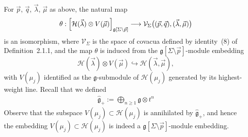 \documentclass[12pt]{article}
\begin{document}
\begin{theorem}[Theorem~2.2.2]
    For $\vec p$, $\vec q$, $\vec\lambda$, $\vec\mu$ as above, the natural map
    \[
        \theta:
        \Bigl[\mathcal H(\vec\lambda)\otimes V(\vec\mu)\Bigr]_{\mathfrak g[\Sigma\setminus\vec p]}
        \longrightarrow
        \mathcal V_{\Sigma}\bigl((\vec p,\vec q),(\vec\lambda,\vec\mu)\bigr)
    \]
    is an isomorphism, where $\mathcal V_{\Sigma}$ is the space of covacua defined by
    identity~(8) of Definition~2.1.1, and the map $\theta$ is induced from the
    $\mathfrak g[\Sigma\setminus\vec p]$-module embedding
    \[
        \mathcal H(\vec\lambda)\otimes V(\vec\mu)
        \hookrightarrow
        \mathcal H(\vec\lambda,\vec\mu),
    \]
    with $V(\mu_j)$ identified as the $\mathfrak g$-submodule of
    $\mathcal H(\mu_j)$ generated by its highest-weight line. Recall that we defined \begin{align*}
        \widehat{\mathfrak g}_+ := \bigoplus_{n \geq 1} \mathfrak g \otimes t^n
    \end{align*}
    Observe that the subspace $V(\mu_j)\subset\mathcal H(\mu_j)$ is annihilated by $\widehat{\mathfrak g}_+$, and hence the embedding $V(\mu_j)\subset\mathcal H(\mu_j)$ is indeed a $\mathfrak g[\Sigma\setminus\vec p]$-module embedding.
\end{theorem}
\end{document}
